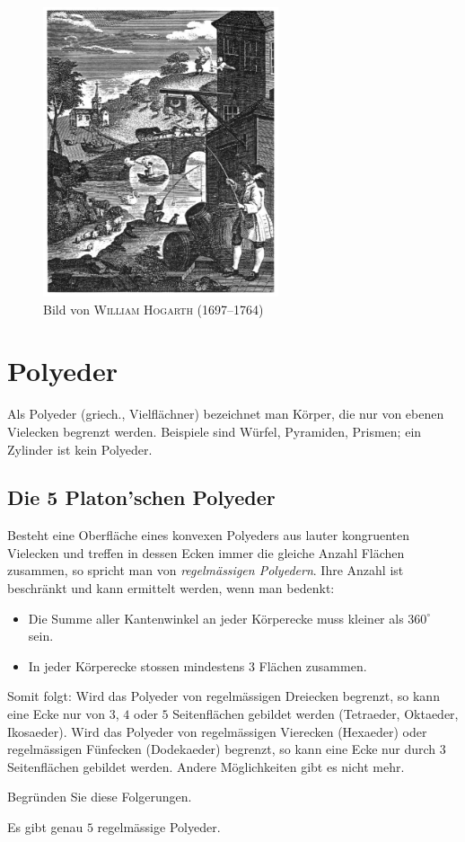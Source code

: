 \documentclass[%
11pt,%
twoside,%
titlepage,%
german,%
headsepline%
]{scrartcl}
\begin{document}
\begin{figure}[h!]
\begin{center}
\includegraphics[width=0.618\textwidth]{pictures/hogarth}
\caption{Bild von \textsc{William Hogarth} (1697--1764)}
\end{center}
\end{figure}

\clearpage

\section{Polyeder}
Als Polyeder (griech., Vielfl\"achner) bezeichnet man K\"orper, die nur von ebenen Vielecken begrenzt werden. Beispiele sind W\"urfel, Pyramiden, Prismen; ein Zylinder ist kein Polyeder.

\subsection{Die 5 Platon'schen Polyeder}
Besteht eine Oberfl\"ache eines konvexen Polyeders aus lauter kongruenten Vielecken und treffen in dessen Ecken immer die gleiche Anzahl Fl\"achen zusammen, so spricht man von \emph{regelm\"assigen Polyedern}. Ihre Anzahl ist beschr\"ankt und kann ermittelt werden, wenn man bedenkt:
\begin{itemize}
\item Die Summe aller Kantenwinkel an jeder K\"orperecke muss kleiner als $360^\circ$ sein.
\item In jeder K\"orperecke stossen mindestens $3$ Fl\"achen zusammen.
\end{itemize}
Somit folgt: Wird das Polyeder von regelm\"assigen Dreiecken begrenzt, so kann eine Ecke nur von $3$, $4$ oder $5$ Seitenfl\"achen gebildet werden (Tetraeder, Oktaeder, Ikosaeder). Wird das Polyeder von regelm\"assigen Vierecken (Hexaeder) oder regelm\"assigen F\"unfecken (Dodekaeder) begrenzt, so kann eine Ecke nur durch $3$ Seitenfl\"achen gebildet werden. Andere M\"oglichkeiten gibt es nicht mehr.
\begin{ueb}
Begr\"unden Sie diese Folgerungen.
\end{ueb}
\begin{csatz}{}
Es gibt genau $5$ regelm\"assige Polyeder.
\end{csatz}
\end{document}
